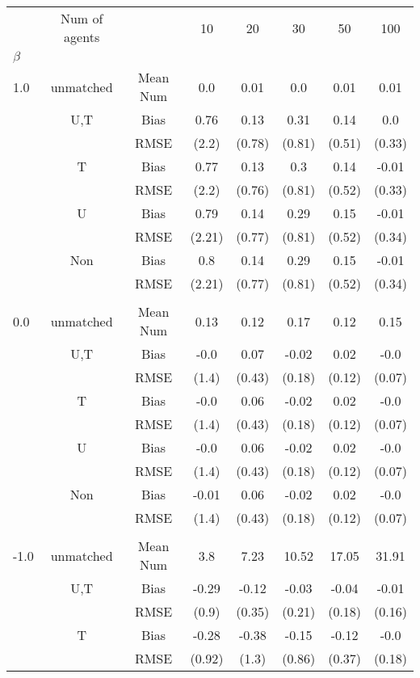 \begin{tabular}{@{\extracolsep{5pt}}lc|cccccc}
\toprule 
 & Num of agents &  & 10 & 20 & 30 & 50 & 100 \\
$\beta$ &  &  &  &  &  &  &  \\
\midrule 
1.0 & unmatched & Mean Num & 0.0 & 0.01 & 0.0 & 0.01 & 0.01 \\
 & U,T & Bias & 0.76 & 0.13 & 0.31 & 0.14 & 0.0 \\
 &  & RMSE & (2.2) & (0.78) & (0.81) & (0.51) & (0.33) \\
 & T & Bias & 0.77 & 0.13 & 0.3 & 0.14 & -0.01 \\
 &  & RMSE & (2.2) & (0.76) & (0.81) & (0.52) & (0.33) \\
 & U & Bias & 0.79 & 0.14 & 0.29 & 0.15 & -0.01 \\
 &  & RMSE & (2.21) & (0.77) & (0.81) & (0.52) & (0.34) \\
 & Non & Bias & 0.8 & 0.14 & 0.29 & 0.15 & -0.01 \\
 &  & RMSE & (2.21) & (0.77) & (0.81) & (0.52) & (0.34) \\
 &  &  &  &  &  &  &  \\
0.0 & unmatched & Mean Num & 0.13 & 0.12 & 0.17 & 0.12 & 0.15 \\
 & U,T & Bias & -0.0 & 0.07 & -0.02 & 0.02 & -0.0 \\
 &  & RMSE & (1.4) & (0.43) & (0.18) & (0.12) & (0.07) \\
 & T & Bias & -0.0 & 0.06 & -0.02 & 0.02 & -0.0 \\
 &  & RMSE & (1.4) & (0.43) & (0.18) & (0.12) & (0.07) \\
 & U & Bias & -0.0 & 0.06 & -0.02 & 0.02 & -0.0 \\
 &  & RMSE & (1.4) & (0.43) & (0.18) & (0.12) & (0.07) \\
 & Non & Bias & -0.01 & 0.06 & -0.02 & 0.02 & -0.0 \\
 &  & RMSE & (1.4) & (0.43) & (0.18) & (0.12) & (0.07) \\
 &  &  &  &  &  &  &  \\
-1.0 & unmatched & Mean Num & 3.8 & 7.23 & 10.52 & 17.05 & 31.91 \\
 & U,T & Bias & -0.29 & -0.12 & -0.03 & -0.04 & -0.01 \\
 &  & RMSE & (0.9) & (0.35) & (0.21) & (0.18) & (0.16) \\
 & T & Bias & -0.28 & -0.38 & -0.15 & -0.12 & -0.0 \\
 &  & RMSE & (0.92) & (1.3) & (0.86) & (0.37) & (0.18) \\

\end{tabular}
